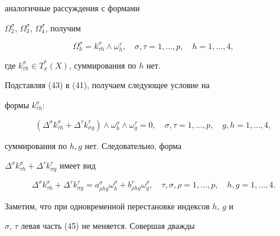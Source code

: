 \begin{pf}
аналогичные рассуждения с формами


$\Omega^{\sigma}_2$, $\Omega^{\sigma}_3$, $\Omega^{\sigma}_4$, получим


%


\begin{equation}


\Omega^{\sigma}_h=k^{\sigma}_{\tau h}\wedge\omega^{\tau}_h,\quad


\sigma,\tau=1,\dotsc,p,\quad h=1,\dotsc,4,


\end{equation}


%


где $k^{\sigma}_{\tau h}\in T^*_x(X)$, суммирования по $h$ нет.


Подставляя (43) в (41), получаем следующее условие на


формы $k^{\sigma}_{\tau h}$:


%


\begin{equation}


(\Delta^{\sigma}k^{\sigma}_{\tau h}+


\Delta^{\tau}k^{\tau}_{\sigma g})\wedge\omega^{\sigma}_h\wedge


\omega^{\tau}_g=0,\quad


\sigma,\tau=1,\dotsc,p,\quad g,h=1,\dotsc,4,


\end{equation}


%


суммирования по $h,g$ нет. Следовательно, форма


$\Delta^{\sigma}k^{\sigma}_{\tau h}+


\Delta^{\tau}k^{\tau}_{\sigma g}$ имеет вид


\begin{equation}


\Delta^{\sigma}k^{\sigma}_{\tau h}+


\Delta^{\tau}k^{\tau}_{\sigma g}=


a^{\sigma}_{\rho hg}\omega^{\rho}_h+


b^{\tau}_{\rho hg}\omega^{\rho}_g,\quad


\tau,\sigma,\rho=1,\dotsc,p,\quad


h,g=1,\dotsc,4.


\end{equation}


Заметим, что при одновременной перестановке индексов $h$, $g$ и


$\sigma$, $\tau$ левая часть (45) не меняется. Совершая дважды



\end{pf}
